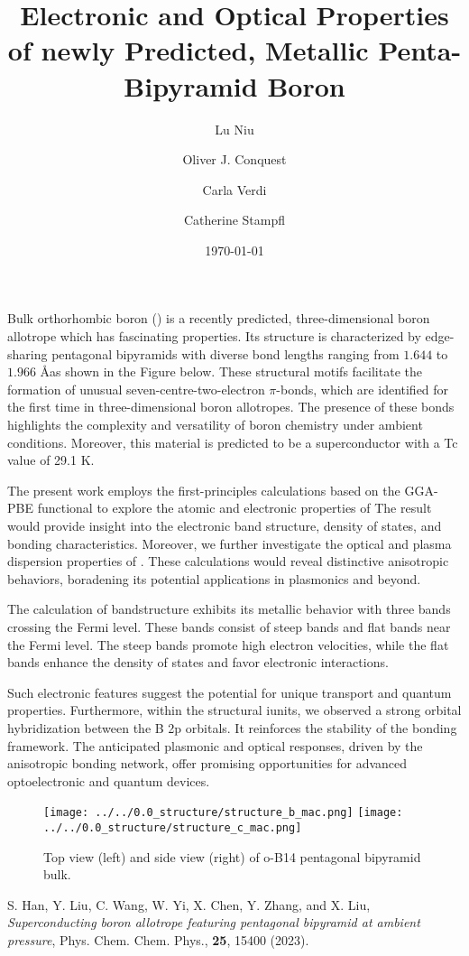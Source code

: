 \documentclass[12pt]{article}
\title{Electronic and Optical Properties of newly Predicted, Metallic Penta-Bipyramid Boron}
\author[1]{Lu Niu}
\author[1]{Oliver J. Conquest}
\author[1,2]{Carla Verdi}
\author[1*]{Catherine Stampfl}
\affil[1]{School of Physics, The University of Sydney, Sydney 2006, NSW, Australia}
\affil[2]{School of Mathematics and Physics, The University of Queensland, Brisbane, Queensland 4072, Australia}
\date{\today}
\begin{document}
\maketitle

\par Bulk orthorhombic boron () is a recently predicted, three-dimensional boron allotrope which has fascinating properties\cite{bulk_boron}. 
Its structure is characterized by edge-sharing pentagonal bipyramids with diverse bond lengths ranging from $1.644$ to $1.966$ \AA as shown in the Figure below.
These structural motifs facilitate the formation of unusual seven-centre-two-electron $\pi$-bonds, which are identified for the first time in three-dimensional boron allotropes.
The presence of these bonds highlights the complexity and versatility of boron chemistry under ambient conditions.
Moreover, this material is predicted to be a superconductor with a Tc value of 29.1 K.

\par The present work employs the first-principles calculations based on the GGA-PBE functional to explore the atomic and electronic properties of 
The result would provide insight into the electronic band structure, density of states, and bonding characteristics.
Moreover, we further investigate the optical and plasma dispersion properties of .
These calculations would reveal distinctive anisotropic behaviors, boradening its potential applications in plasmonics and beyond.

\par The calculation of bandstructure exhibits its metallic behavior with three bands crossing the Fermi level.
These bands consist of steep bands and flat bands near the Fermi level.
The steep bands promote high electron velocities, while the flat bands enhance the density of states and favor electronic interactions.

\par Such electronic features suggest the potential for unique transport and quantum properties.
Furthermore, within the structural iunits, we observed a strong orbital hybridization between the B 2p orbitals.
It reinforces the stability of the bonding framework.
The anticipated plasmonic and optical responses, driven by the anisotropic bonding network, offer promising opportunities for advanced optoelectronic and quantum devices.

\begin{figure}[h!]
    \centering
    \texttt{[image: ../../0.0\_structure/structure\_b\_mac.png]}\hfill
    \texttt{[image: ../../0.0\_structure/structure\_c\_mac.png]}
    \caption{Top view (left) and side view (right) of o-B14 pentagonal bipyramid bulk.}
    \label{fig:o-b14_views}
\end{figure}

\begin{thebibliography}{01}
     S. Han, Y. Liu, C. Wang, W. Yi, X. Chen, Y. Zhang, and X. Liu, 
    \textit{Superconducting boron allotrope featuring pentagonal bipyramid at ambient pressure}, Phys. Chem. Chem. Phys., \textbf{25}, 15400 (2023).
\end{thebibliography}
\end{document}
